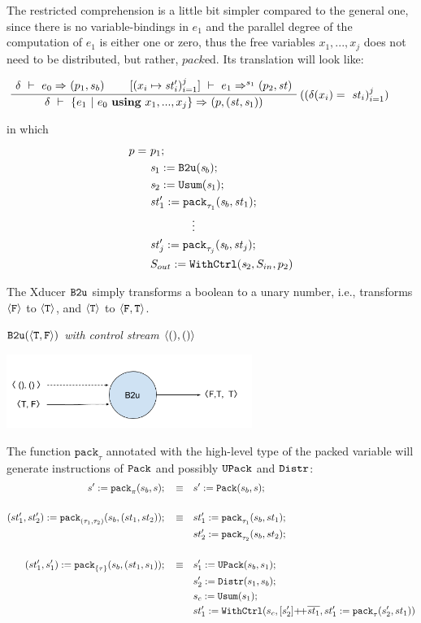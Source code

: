 The restricted comprehension is a little bit simpler compared to the general one, since there is no variable-bindings in $e_1$ and the parallel degree of the computation of $e_1$ is either one or zero, thus the free variables $x_1,...,x_j$ does not need to be distributed, but rather, $pack$ed. Its translation will look like:

$$\PT{
	\AC{\Trans{\del}{e_0}{}{}{(p_1,s_b)}}
	\AC{\Trans{[\j{x_i \|-> \st'_i}]}{e_1}{s_1}{}{\sfun{p_2}{\st}}}
	\RiLa{(\j{\del(x_i) = \ \st_i})}		
	\BC{\Trans{\del}{\RComp{e_1}{e_0}{\usevars}}{}{}
		{ \sfun{p} {(\st,\s_1)}}}
}$$


in which $$ \begin{aligned}
p = & \ p_1; \\
& \ \sdef{\s_1}{\bu(\s_b)}; \\
& \ \sdef{\s_2}{\usum(\s_1)}; \\
& \ \sdef{\st_1'}{\Pack{\s_b}{\st_1}{\tau_1}}; \\
& \qquad \qquad \vdots \\
& \ \sdef{\st_j'}{\Pack{\s_b}{\st_j}{\tau_j}}; \\
& \ \withctrl{\s_2}{p_2}{\Sin}{\Sout} \\
\end{aligned}$$
	
The Xducer $\bu$ simply transforms a boolean to a unary number, i.e.,  transforms $\oF$ to $\oT$, and $\oT$ to $\< \F, \T \'>$.
\begin{example} \emph{$\bu({\<\T,\F\'>})$ with control stream $\< (),() \'>$}\\
	\begin{center}
		\includegraphics[width=0.6\textwidth]{fig/b2uxducer.png}
	\end{center}
\end{example}

The function $\mathtt{pack}_{\tau}$ annotated with the high-level type of the packed variable will generate instructions of $\pack$ and possibly $\upack$ and $\distr$:
\begin{align*}
s' := \Pack{s_b}{s}{\pi}; \quad \equiv & \quad s' := \packf{s_b}{s}; \\
\\
(st'_1,st'_2)  := \Pack{s_b}{(st_1,st_2)}{(\tau_1,\tau_2)}; \quad \equiv & \quad st_1' := \Pack{s_b}{st_1}{\tau_1}; \\ 
&\quad st_2' := \Pack{s_b}{st_2}{\tau_2};\\
\\
(st'_1,s_1')  := \Pack{s_b}{(st_1,s_1)}{\{\tau\}}; \quad \equiv & \quad s_1' := \upackf{s_b}{s_1}; \\ 
&\quad s_2' := \distrf{s_1}{s_b};\\
&\quad s_c := \usumf{s_1}; \\
&\quad \withctrl{s_c}{st_1' :=  \Pack{s_2'}{st_1}{\tau}}{[s_2'] {\++} \ol{st_1}}{st'_1} \\
\end{align*}

